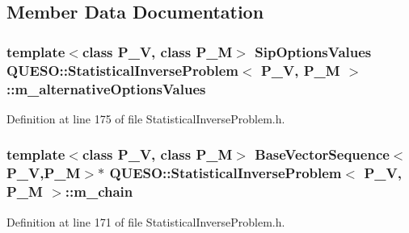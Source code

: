 \subsection{Member Data Documentation}
\hypertarget{class_q_u_e_s_o_1_1_statistical_inverse_problem_a71659d2393ea46940f963acc95285f17}{
\subsubsection[{m\-\_\-alternative\-Options\-Values}]{\setlength{\rightskip}{0pt plus 5cm}template$<$class P\-\_\-\-V, class P\-\_\-\-M$>$ {\bf Sip\-Options\-Values} {\bf Q\-U\-E\-S\-O\-::\-Statistical\-Inverse\-Problem}$<$ P\-\_\-\-V, P\-\_\-\-M $>$\-::m\-\_\-alternative\-Options\-Values\hspace{0.3cm}{\ttfamily [private]}}}\label{class_q_u_e_s_o_1_1_statistical_inverse_problem_a71659d2393ea46940f963acc95285f17}


Definition at line 175 of file Statistical\-Inverse\-Problem.\-h.

\hypertarget{class_q_u_e_s_o_1_1_statistical_inverse_problem_a5f6b98058067d21fb16981844e32910d}{
\subsubsection[{m\-\_\-chain}]{\setlength{\rightskip}{0pt plus 5cm}template$<$class P\-\_\-\-V, class P\-\_\-\-M$>$ {\bf Base\-Vector\-Sequence}$<$P\-\_\-\-V,P\-\_\-\-M$>$$\ast$ {\bf Q\-U\-E\-S\-O\-::\-Statistical\-Inverse\-Problem}$<$ P\-\_\-\-V, P\-\_\-\-M $>$\-::m\-\_\-chain\hspace{0.3cm}{\ttfamily [private]}}}\label{class_q_u_e_s_o_1_1_statistical_inverse_problem_a5f6b98058067d21fb16981844e32910d}


Definition at line 171 of file Statistical\-Inverse\-Problem.\-h.

